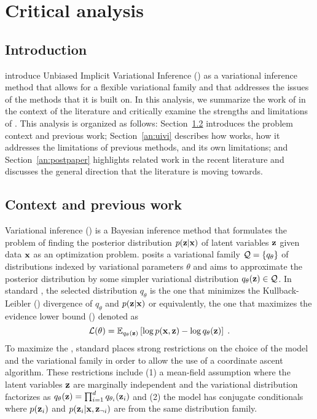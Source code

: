 \documentclass[10pt]{article}
\title{\todo}
\author{Kenny Chiu}
\date{\today}
\begin{document}
\maketitle


\newpage


\section{Critical analysis}

\subsection{Introduction}

\todo \citet{Titsias:2019} introduce Unbiased Implicit Variational Inference (\uivi) as a variational inference method that allows for a flexible variational family and that addresses the issues of the methods that it is built on. In this analysis, we summarize the work of \citet{Titsias:2019} in the context of the literature and critically examine the strengths and limitations of \uivi. This analysis is organized as follows: Section~\ref{an:literature} introduces the problem context and previous work; Section~\ref{an:uivi} describes how \uivi works, how it addresses the limitations of previous methods, and its own limitations; and Section~\ref{an:postpaper} highlights related work in the recent literature and discusses the general direction that the literature is moving towards.

\subsection{Context and previous work} \label{an:literature}

Variational inference (\vi) \citep{Jordan:1999} is a Bayesian inference method that formulates the problem of finding the posterior distribution $p(\mathbf{z}|\mathbf{x})$ of latent variables $\mathbf{z}$ given data $\mathbf{x}$ as an optimization problem. \vi posits a variational family $\mathcal{Q}=\{q_\theta\}$ of distributions indexed by variational parameters $\theta$ and aims to approximate the posterior distribution by some simpler variational distribution $q_\theta(\mathbf{z})\in\mathcal{Q}$. In standard \vi, the selected distribution $q_\theta$ is the one that minimizes the Kullback-Leibler (\kl) divergence of $q_\theta$ and $p(\mathbf{z}|\mathbf{x})$ or equivalently, the one that maximizes the evidence lower bound (\elbo) denoted as
\[
\mathcal{L}(\theta) = \mathbb{E}_{q_\theta(\mathbf{z})}\left[\log p(\mathbf{x},\mathbf{z}) - \log q_\theta(\mathbf{z})\right] \;.
\]
To maximize the \elbo, standard \vi places strong restrictions on the choice of the model and the variational family in order to allow the use of a coordinate ascent algorithm. These restrictions include (1) a mean-field assumption where the latent variables $\mathbf{z}$ are marginally independent and the variational distribution factorizes as $q_\theta(\mathbf{z})=\prod_{i=1}^dq_{\theta_i}(\mathbf{z}_i)$ and (2) the model has conjugate conditionals where $p(\mathbf{z}_i)$ and $p(\mathbf{z}_i|\mathbf{x},\mathbf{z}_{\neg i})$ are from the same distribution family.
\\
\end{document}
